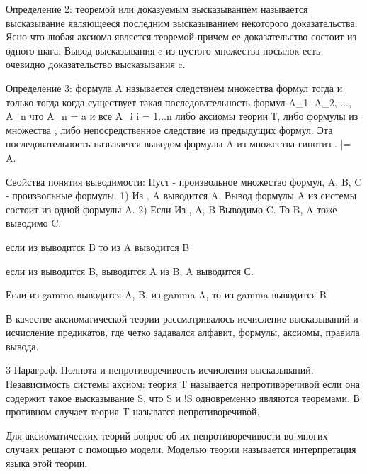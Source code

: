 Определение 2: теоремой или доказуемым высказыванием называется высказывание являющееся последним высказыванием некоторого доказательства. Ясно что любая аксиома является теоремой причем ее доказательство состоит из одного шага. Вывод высказывания c из пустого множества посылок есть очевидно доказательство высказывания c.

Определение 3: формула A называется следствием множества формул \gamma тогда и только тогда когда существует такая последовательность формул A_1, A_2, ..., A_n что A_n = a и все A_i i = 1...n либо аксиомы теории Т, либо формулы из множества \gamma, либо непосредственное следствие из предыдущих формул. Эта последовательность называется выводом формулы A из множества гипотиз \gamma.
\gamma |= A.

Свойства понятия выводимости:
Пуст \gamma - произвольное множество формул, A, B, C - произвольные формулы.
1) Из \gamma, A выводится A. Вывод формулы A из системы \gamma состоит из одной формулы A.
2) Если Из \gamma, A, B Выводимо C.
То \gamma B, A тоже выводимо C.

если из \gamma выводится B то из \gamma A выводится B

если из \gamma выводится B, \gamma выводится A
из B, A выводится С.

Если из gamma выводится A, B.
из gamma A,
то из gamma выводится B


В качестве аксиоматической теории рассматривалось исчисление высказываний и исчисление предикатов, где четко задавался алфавит, формулы, аксиомы, правила вывода.

3 Параграф.
Полнота и непротиворечивость исчисления высказываний. Независимость системы аксиом: теория T называется непротиворечивой если она содержит такое высказывание S, что S и !S одновременно являются теоремами.
В противном случает теория T называтся непротиворечивой.

Для аксиоматических теорий вопрос об их непротиворечивости во многих случаях решают с помощью модели. Моделью теории называется интерпретация языка этой теории.

